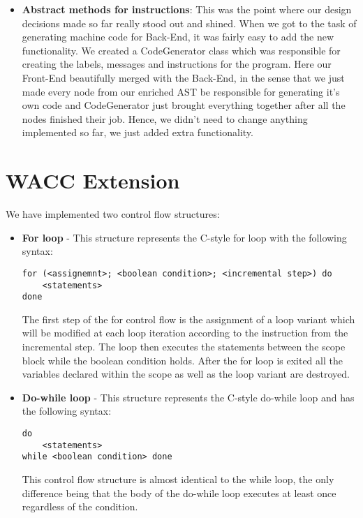 \documentclass[11pt]{article}
\begin{document}
\begin{itemize}[noitemsep,topsep=0pt]
  \item \textbf{Abstract methods for instructions}:
    This was the point where our design decisions made so far really stood out and shined. When we got to the task of generating machine code for Back-End, it was fairly easy to add the new functionality. We created a CodeGenerator class which was responsible for creating the labels, messages and instructions for the program. Here our Front-End beautifully merged with the Back-End, in the sense that we just made every node from our enriched AST be responsible for generating it's own code and CodeGenerator just brought everything together after all the nodes finished their job. Hence, we didn't need to change anything implemented so far, we just added extra functionality.
\end{itemize}


\section{WACC Extension}
\iffalse
BEYOND THE SPECIFICATION(4/4)
1. An evaluation of your extensions to your WACC compiler
2. Describe all of the language extensions, optimisations or other aspects that you have added to your compiler, including how these features can be accessed or viewed
3. BRIEFLY discuss what future extensions you would like to add to your WACC compiler if you had more time
\fi

We have implemented two control flow structures:
\begin{itemize}
\item \textbf{For loop} - This structure represents the C-style for loop with the following syntax:
\begin{lstlisting}
for (<assignemnt>; <boolean condition>; <incremental step>) do
	<statements>
done
\end{lstlisting}
The first step of the for control flow is the assignment of a loop variant which will be modified at each loop iteration according to the instruction from the incremental step. The loop then executes the statements between the scope block while the boolean condition holds. After the for loop is exited all the variables declared within the scope as well as the loop variant are destroyed.
\item \textbf{Do-while loop} - This structure represents the C-style do-while loop and has the following syntax:
\begin{lstlisting}
do
	<statements>
while <boolean condition> done
\end{lstlisting}
This control flow structure is almost identical to the while loop, the only difference being that the body of the do-while loop executes at least once regardless of the condition.
\end{itemize}
\end{document}
